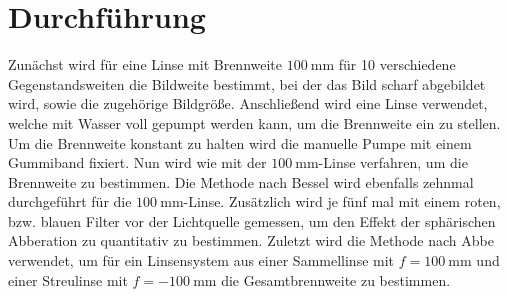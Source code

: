 \section{Durchführung}
\label{sec:Durchführung}
Zunächst wird für eine Linse mit Brennweite $\SI{100}{\milli \meter}$ für 10 verschiedene Gegenstandsweiten die Bildweite bestimmt, bei der das Bild scharf abgebildet wird, sowie die zugehörige Bildgröße.
Anschließend wird eine Linse verwendet, welche mit Wasser voll gepumpt werden kann, um die Brennweite ein zu stellen. Um die Brennweite konstant zu halten wird die manuelle Pumpe mit einem Gummiband fixiert. Nun wird wie mit der $\SI{100}{\milli \meter}$-Linse verfahren, um die Brennweite zu bestimmen.
Die Methode nach Bessel wird ebenfalls zehnmal durchgeführt für die $\SI{100}{\milli \meter}$-Linse. Zusätzlich wird je fünf mal mit einem roten, bzw. blauen Filter vor der Lichtquelle gemessen, um den Effekt der sphärischen Abberation zu quantitativ zu bestimmen.
Zuletzt wird die Methode nach Abbe verwendet, um für ein Linsensystem aus einer Sammellinse mit $f=\SI{100}{\milli \meter}$ und einer Streulinse mit $f=\SI{-100}{\milli \meter}$ die Gesamtbrennweite zu bestimmen.
